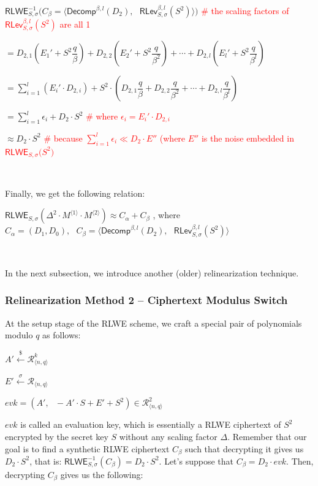 $\textsf{RLWE}_{S, \sigma}^{-1}(C_\beta = \bm{\langle} \textsf{Decomp}^{\beta, l}(D_2), \text{ } \textsf{RLev}_{S, \sigma}^{\beta, l}( S^2) \bm{\rangle} \bm{)}$ \textcolor{red}{ \# the scaling factors of $\textsf{RLev}_{S, \sigma}^{\beta, l}( S^2)$ are all 1}

$= D_{2,1}(E_1' +  S^2\dfrac{q}{\beta}) + D_{2,2}(E_2' +  S^2\dfrac{q}{\beta^2}) + \cdots + D_{2,l}(E_l' +  S^2\dfrac{q}{\beta^l})$

$= \sum\limits_{i=1}^{l} (E_i'\cdot D_{2,i}) +  S^2\cdot(D_{2,1}\dfrac{q}{\beta} + D_{2,2}\dfrac{q}{\beta^2} + \cdots + D_{2, l}\dfrac{q}{\beta^l})$

$= \sum\limits_{i=1}^{l} \epsilon_{i} + D_2\cdot S^2$ \textcolor{red}{ \text{ } \# where $\epsilon_i = E_i'\cdot D_{2,i}$}

$\approx D_2\cdot S^2$ \textcolor{red}{ \text{ } \# because $\sum\limits_{i=1}^{l} \epsilon_{i} \ll D_2\cdot E''$ (where $E''$ is the noise embedded in $\textsf{RLWE}_{S, \sigma}\bm(S^2\bm)$}

$ $

Finally, we get the following relation:

$\textsf{RLWE}_{S, \sigma}(\Delta^2 \cdot M^{\langle 1 \rangle} \cdot M^{\langle 2 \rangle}) \approx C_\alpha + C_\beta$ \text{ } , where \text{ } $C_\alpha = (D_1, D_0), \text{ } C_\beta = \bm{\langle}  \textsf{Decomp}^{\beta, l}(D_2), \text{ } \textsf{RLev}_{S, \sigma}^{\beta, l}( S^2) \bm{\rangle}$

$ $

In the next subsection, we introduce another (older) relinearization technique. 

\subsubsection{Relinearization Method 2 -- Ciphertext Modulus Switch}
\label{subsubsec:relinearization-modulus-switch}


At the setup stage of the RLWE scheme, we craft a special pair of polynomials modulo $q$ as follows: 

$A'  \xleftarrow{\$} \mathcal{R}_{\langle n,q\rangle }^{k}$

$E' \xleftarrow{\sigma} \mathcal{R}_{\langle n,q\rangle }$


$\mathit{evk} = (A', \text{ } -A'\cdot S + E' +  S^2) \in \mathcal{R}_{\langle n, q\rangle}^2$


$\mathit{evk}$ is called an evaluation key, which is essentially a RLWE ciphertext of $ S^2$ encrypted by the secret key $S$ without any scaling factor $\Delta$. Remember that our goal is to find a synthetic RLWE ciphertext $C_\beta$ such that decrypting it gives us $D_2\cdot S^2$, that is: $\textsf{RLWE}_{S, \sigma}^{-1}(C_\beta) = D_2\cdot S^2$. Let's suppose  that $C_\beta = D_2 \cdot \mathit{evk}$. Then, decrypting $C_\beta$ gives us the following:

